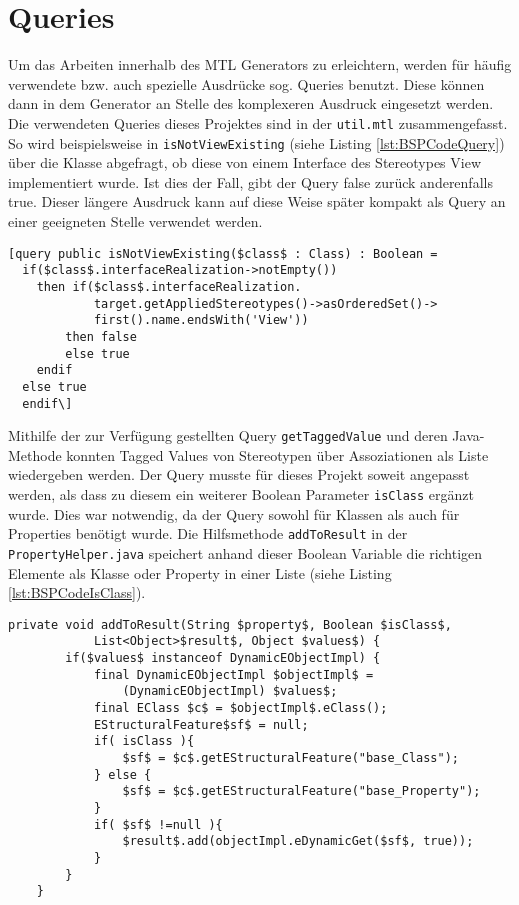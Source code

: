 \section{Queries} \label{Queries}
Um das Arbeiten innerhalb des MTL Generators zu erleichtern, werden für häufig verwendete bzw. auch spezielle Ausdrücke sog. Queries benutzt. Diese können dann in dem Generator an Stelle des komplexeren Ausdruck eingesetzt werden. Die verwendeten Queries dieses Projektes sind in der \texttt{util.mtl} zusammengefasst. So wird beispielsweise in \texttt{isNotViewExisting} (siehe Listing \ref{lst:BSPCodeQuery}) über die Klasse abgefragt, ob diese von einem Interface des Stereotypes View implementiert wurde. Ist dies der Fall, gibt der Query false zurück anderenfalls true. Dieser längere Ausdruck kann auf diese Weise später kompakt als Query an einer geeigneten Stelle verwendet werden.\\

\lstset{language=mtl}
\begin{lstlisting}[caption={Query für \texttt{isNotViewExisting}}, label={lst:BSPCodeQuery}]
[query public isNotViewExisting($class$ : Class) : Boolean = 
  if($class$.interfaceRealization->notEmpty())
	then if($class$.interfaceRealization.
			target.getAppliedStereotypes()->asOrderedSet()->
			first().name.endsWith('View')) 
		then false 
		else true 
    endif 
  else true 
  endif\]
\end{lstlisting}

Mithilfe der zur Verfügung gestellten Query \texttt{getTaggedValue} und deren Java-Methode konnten Tagged Values von Stereotypen über Assoziationen als Liste wiedergeben werden. Der Query musste für dieses Projekt soweit angepasst werden, als dass zu diesem ein weiterer Boolean Parameter \texttt{isClass} ergänzt wurde. Dies war notwendig, da der Query sowohl für Klassen als auch für Properties benötigt wurde.
Die Hilfsmethode \texttt{addToResult} in der \texttt{PropertyHelper.java} speichert anhand dieser Boolean Variable die richtigen Elemente als Klasse oder Property in einer Liste (siehe Listing \ref{lst:BSPCodeIsClass}).
\lstset{language=gwt}
\begin{lstlisting}[caption={Hilfsmethode \texttt{addToResult} der \texttt{PropertyHelper.java}}, label={lst:BSPCodeIsClass}]
private void addToResult(String $property$, Boolean $isClass$,
			List<Object>$result$, Object $values$) {
		if($values$ instanceof DynamicEObjectImpl) {
			final DynamicEObjectImpl $objectImpl$ = 
				(DynamicEObjectImpl) $values$;
			final EClass $c$ = $objectImpl$.eClass();
			EStructuralFeature$sf$ = null;
			if( isClass ){
				$sf$ = $c$.getEStructuralFeature("base_Class");
			} else {
				$sf$ = $c$.getEStructuralFeature("base_Property");
			}
			if( $sf$ !=null ){
				$result$.add(objectImpl.eDynamicGet($sf$, true));
			}
		}
	}
\end{lstlisting}